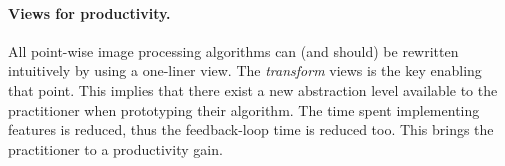 \paragraph{Views for productivity.} All point-wise image processing algorithms can (and should) be rewritten intuitively by
using a one-liner view. The \emph{transform} views is the key enabling that point. This implies that there exist a new
abstraction level available to the practitioner when prototyping their algorithm. The time spent implementing features
is reduced, thus the feedback-loop time is reduced too. This brings the practitioner to a productivity gain.
